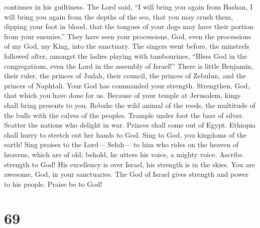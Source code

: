 continues in his guiltiness.  The Lord said, ``I will
bring you again from Bashan, I will bring you again from the depths of
the sea,  that you may crush them, dipping your foot in
blood, that the tongues of your dogs may have their portion from your
enemies.''  They have seen your processions, God, even
the processions of my God, my King, into the sanctuary. 
The singers went before, the minstrels followed after, amongst the
ladies playing with tambourines,  ``Bless God in the
congregations, even the Lord in the assembly of Israel!''
 There is little Benjamin, their ruler, the princes of
Judah, their council, the princes of Zebulun, and the princes of
Naphtali.  Your God has commanded your strength.
Strengthen, God, that which you have done for us. 
Because of your temple at Jerusalem, kings shall bring presents to you.
 Rebuke the wild animal of the reeds, the multitude of
the bulls with the calves of the peoples. Trample under foot the bars of
silver. Scatter the nations who delight in war.  Princes
shall come out of Egypt. Ethiopia shall hurry to stretch out her hands
to God.  Sing to God, you kingdoms of the earth! Sing
praises to the Lord--- Selah---  to him who rides on the
heaven of heavens, which are of old; behold, he utters his voice, a
mighty voice.  Ascribe strength to God! His excellency is
over Israel, his strength is in the skies.  You are
awesome, God, in your sanctuaries. The God of Israel gives strength and
power to his people. Praise be to God!

\hypertarget{section-68}{%
\section{69}\label{section-68}}

